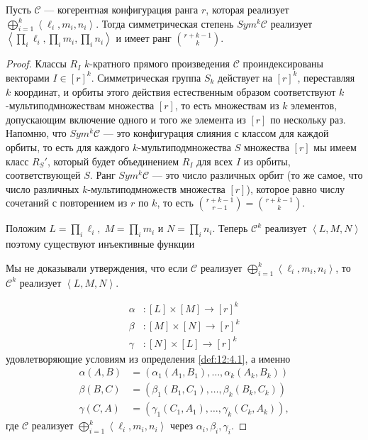 \begin{theorem}\label{th:12:5.3} 
  Пусть $\mathscr{C}$ --- когерентная конфигурация ранга $r$, которая реализует $\bigoplus_{i=1}^k \left\langle \ell_i, m_i, n_i  \right\rangle$. Тогда симметрическая степень $Sym^k \mathscr{C}$ реализует $\left\langle \prod_i \ell_i, \prod_i m_i, \prod_i n_i \right\rangle$ и имеет ранг $\binom{r+k-1}{k}$.
\end{theorem}
\begin{proof}
  Классы $R_I$ $k$-кратного прямого произведения $\mathscr{C}$ проиндексированы векторами $I \in [r]^k$. Симметрическая группа $S_k$ действует на $[r]^k$, переставляя $k$ координат, и орбиты этого действия естественным образом соответствуют $k$-мультиподмножествам множества $[r]$, то есть множествам из $k$ элементов, допускающим включение одного и того же элемента из $[r]$ по нескольку раз. Напомню, что $Sym^k \mathscr{C}$ --- это конфигурация слияния с классом для каждой орбиты, то есть для каждого $k$-мультиподмножества $S$ множества $[r]$ мы имеем класс $R_S'$, который будет объединением $R_I$ для всех $I$ из орбиты, соответствующей $S$. Ранг $Sym^k \mathscr{C}$ --- это число различных орбит (то же самое, что число различных $k$-мультиподмножеств множества $[r]$), которое равно числу сочетаний с повторением из $r$ по $k$, то есть $\binom{r+k-1}{r-1} = \binom{r+k-1}{k}$.
  
 Положим $L=\prod_i \ell_i,\; M=\prod_i m_i$ и $N=\prod_i n_i$. Теперь $\mathscr{C}^k$ реализует $\left\langle L,M,N \right\rangle$ поэтому существуют инъективные функции
 \begin{question}
 	Мы не доказывали утверждения, что если $\mathscr{C}$ реализует $\bigoplus_{i=1}^k \left\langle \ell_i, m_i, n_i  \right\rangle$, то $\mathscr{C}^k$ реализует $\left\langle L,M,N \right\rangle$.
 \end{question}
 \begin{align*}
 	\alpha &: [L] \times [M] \to [r]^k\\
 	\beta &: [M] \times [N] \to [r]^k\\
 	\gamma &: [N] \times [L] \to [r]^k
 \end{align*}
 удовлетворяющие условиям из определения \ref{def:12:4.1}, а именно
 \begin{align*}
   \alpha(A,B) & = (\alpha_1(A_1,B_1), \dotsc, \alpha_k(A_k,B_k))   \\
   \beta(B,C) & = (\beta_1(B_1,C_1), \dotsc, \beta_k(B_k,C_k))\\
   \gamma(C,A) & = (\gamma_1(C_1,A_1), \dotsc, \gamma_k(C_k,A_k)),
 \end{align*}
 где $\mathscr{C}$ реализует $\bigoplus_{i=1}^k \left\langle \ell_i, m_i, n_i  \right\rangle$ через $\alpha_i,\beta_i,\gamma_i$.
 

\end{proof}
